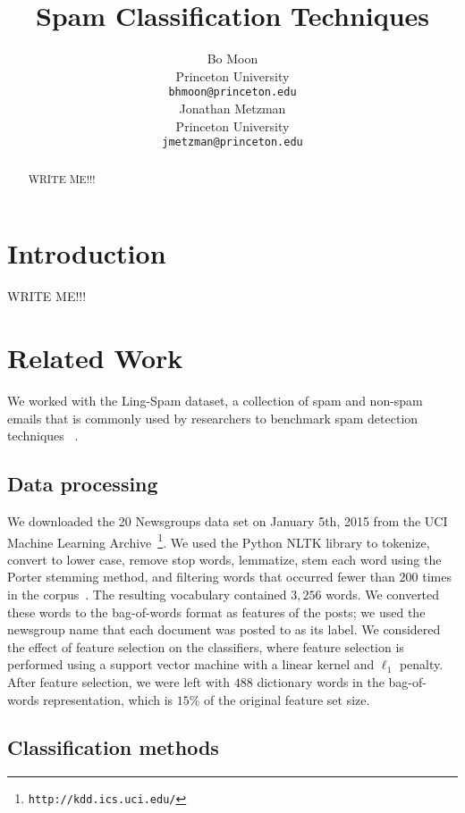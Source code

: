 \documentclass{article} %
\title{Spam Classification Techniques}
\author{
Bo Moon\\
Princeton University\\
\texttt{bhmoon@princeton.edu} \\
\And
Jonathan Metzman\\
Princeton University \\
\texttt{jmetzman@princeton.edu} \\
}
\begin{document}
\maketitle

\begin{abstract}
WRITE ME!!!
\end{abstract}
\section{Introduction}
WRITE ME!!!
\section{Related Work}

We worked with the Ling-Spam dataset, a collection of spam and non-spam emails that is commonly used by researchers to benchmark spam detection techniques ~\cite{cormack2008email}.

\subsection{Data processing}

We downloaded the 20 Newsgroups data set on January 5th, 2015 from the UCI Machine Learning Archive~\footnote{{\tt http://kdd.ics.uci.edu/}}. We used the Python NLTK library to tokenize, convert to lower case, remove stop words, lemmatize, stem each word using the Porter stemming method, and filtering words that occurred fewer than $200$ times in the corpus~\cite{bird2009}. The resulting vocabulary contained $3,256$ words. We converted these words to the bag-of-words format as features of the posts; we used the newsgroup name that each document was posted to as its label. We considered the effect of feature selection on the classifiers, where feature selection is performed using a support vector machine with a linear kernel and $\ell_1$ penalty. After feature selection, we were left with $488$ dictionary words in the bag-of-words representation, which is $15\%$ of the original feature set size.

\subsection{Classification methods}
\end{document}
